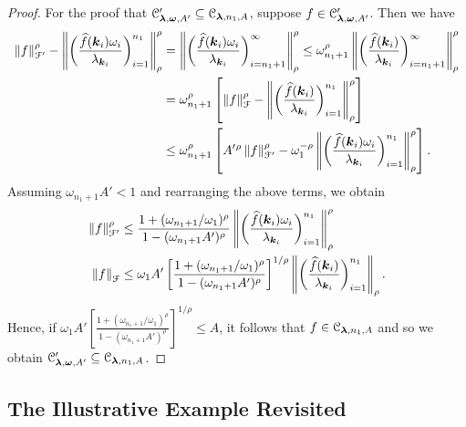\documentclass[USenglish]{article}
\theoremstyle{dgthm}
\theoremstyle{dgthm}
\theoremstyle{dgthm}
\theoremstyle{dgthm}
\theoremstyle{dgdef}
\theoremstyle{definition}
\newcommand{\hf}{\widehat{f}}
\newcommand{\norm}[2][{}]{\ensuremath{\left \lVert #2 \right \rVert}_{#1}}
\begin{document}
{\begin{proof}
For the proof that 
${\mathcal{C}}'_{\boldsymbol{\lambda}, \boldsymbol{\omega}, A'}
\subseteq 
{\mathcal{C}}_{\boldsymbol{\lambda}, n_1, A}$, 
suppose $f \in {\mathcal{C}}'_{\boldsymbol{\lambda},\boldsymbol{\omega},  A'}$. Then we have
\begin{align*}
    \norm[\calF']{f}^\rho- \norm[\rho]{\biggl ( \frac{\hf(\bsk_i) \omega_i }{\lambda_{\bsk_i}} \biggr) _{i=1}^{n_1}}^\rho 
	& = \norm[\rho]{\biggl ( \frac{\hf(\bsk_i) \omega_i }{\lambda_{\bsk_i}} \biggr) _{i=n_1 + 1}^{\infty}}^\rho 
     \le \omega_{n_1+1}^\rho \norm[\rho]{\biggl ( \frac{\hf(\bsk_i) }{\lambda_{\bsk_i}} \biggr) _{i=n_1 + 1}^{\infty}}^\rho \\
     & = \omega_{n_1+1}^\rho \left[ \norm[\calF]{f}^\rho - \norm[\rho]{\biggl ( \frac{\hf(\bsk_i) }{\lambda_{\bsk_i}} \biggr) _{i=1}^{n_1}}^\rho \right ]\\	
     & \le \omega_{n_1+1}^\rho \left[ A'{}^\rho \norm[\calF']{f}^\rho - \omega_1^{-\rho} \norm[\rho]{\biggl ( \frac{\hf(\bsk_i) \omega_i}{\lambda_{\bsk_i}} \biggr) _{i=1}^{n_1}}^\rho \right ].
\end{align*}
Assuming $\omega_{n_1+1}A' < 1$ and rearranging the above terms, we obtain
\begin{align*}
\norm[\calF']{f}^\rho & \le \frac{1 + (\omega_{n_1+1}/\omega_1)^\rho}{1 - (\omega_{n_1+1}A')^\rho} \norm[\rho]{\biggl ( \frac{\hf(\bsk_i) \omega_i }{\lambda_{\bsk_i}} \biggr) _{i=1}^{n_1}}^\rho \\
	\norm[\calF]{f} & \le \omega_1A'\left[\frac{1 + (\omega_{n_1+1}/\omega_1)^\rho}{1 - (\omega_{n_1+1}A')^\rho}\right]^{1/\rho} \norm[\rho]{\biggl ( \frac{\hf(\bsk_i)}{\lambda_{\bsk_i}} \biggr) _{i=1}^{n_1}}.
\end{align*}
Hence, if $\omega_1A'\left[\frac{1 + (\omega_{n_1+1}/\omega_1)^\rho}{1 - (\omega_{n_1+1}A')^\rho}\right]^{1/\rho} \le A$, it follows that $f \in {\mathcal{C}}_{\boldsymbol{\lambda}, n_1, A}$ and so
we obtain $
{\mathcal{C}}'_{\boldsymbol{\lambda}, \boldsymbol{\omega}, A'}
\subseteq
{\mathcal{C}}_{\boldsymbol{\lambda}, n_1, A}
$.
\end{proof}
}


\subsection{The Illustrative Example Revisited}\label{DHKM:revisexamp}
\end{document}
